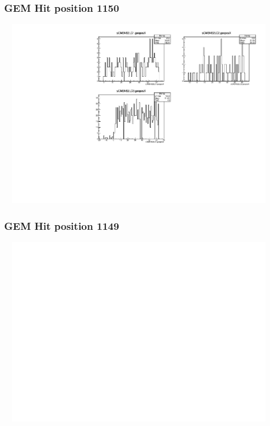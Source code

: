 \documentclass[slidestop,compress,mathserif]{beamer}
\begin{document}
\begin{frame}\frametitle{GEM Hit position 1150}
	 \includegraphics[width=12cm,height=8cm]{GEM_Hit_position_1150.pdf}
\end{frame}
\begin{frame}\frametitle{GEM Hit position 1149}
	 \includegraphics[width=12cm,height=8cm]{GEM_Hit_position_1149.pdf}
\end{frame}
\end{document}
